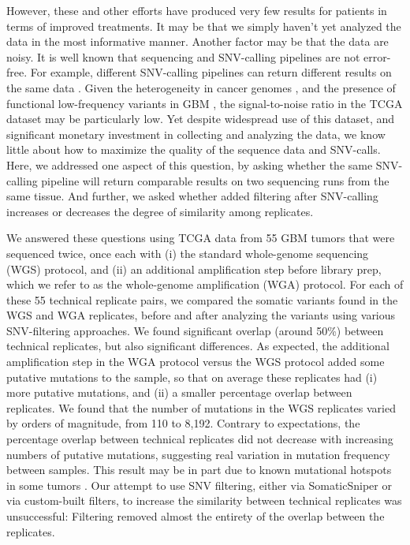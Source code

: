 \documentclass[11pt]{article} %
\begin{document}
However, these and other efforts have produced very few results for patients in terms of improved treatments. It may be that we simply haven't yet analyzed the data in the most informative manner. Another factor may be that the data are noisy. It is well known that sequencing and SNV-calling pipelines are not error-free. For example, different SNV-calling pipelines can return different results on the same data \citep{SNPcall}. Given the heterogeneity in cancer genomes \citep{heterogenous1, heterogenous2}, and the presence of functional low-frequency variants in GBM \citep{rare}, the signal-to-noise ratio in the TCGA dataset may be particularly low. Yet despite widespread use of this dataset, and significant monetary investment in collecting and analyzing the data, we know little about how to maximize the quality of the sequence data and SNV-calls. Here, we addressed one aspect of this question, by asking whether the same SNV-calling pipeline will return comparable results on two sequencing runs from the same tissue. And further, we asked whether added filtering after SNV-calling increases or decreases the degree of similarity among replicates.

We answered these questions using TCGA data from 55 GBM tumors that were sequenced twice, once each with (i) the standard whole-genome sequencing (WGS) protocol, and (ii) an additional amplification step before library prep, which we refer to as the whole-genome amplification (WGA) protocol. For each of these 55 technical replicate pairs, we compared the somatic variants found in the WGS and WGA replicates, before and after analyzing the variants using various SNV-filtering approaches. We found significant overlap (around 50\%) between technical replicates, but also significant differences. As expected, the additional amplification step in the WGA protocol versus the WGS protocol added some putative mutations to the sample, so that on average these replicates had (i) more putative mutations, and (ii) a smaller percentage overlap between replicates. We found that the number of mutations in the WGS replicates varied by orders of magnitude, from 110 to 8,192. Contrary to expectations, the percentage overlap between technical replicates did not decrease with increasing numbers of putative mutations, suggesting real variation in mutation frequency between samples. This result may be in part due to known mutational hotspots in some tumors \citep{Karen}. Our attempt to use SNV filtering, either via SomaticSniper \citep{SomaticSniper} or via custom-built filters, to increase the similarity between technical replicates was unsuccessful: Filtering removed almost the entirety of the overlap between the replicates.
\end{document}
